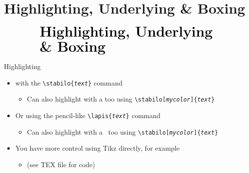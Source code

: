\documentclass[10pt,itemsep]{beamer}
\begin{document}
\section{Highlighting, Underlying \& Boxing}
\begin{frame}
    \begin{eqnarray*}
        &\text{{\huge \textbf{Highlighting, Underlying}}}\\
        &\text{{\huge \textbf{\& Boxing}}}\\
    \end{eqnarray*}
\end{frame}
\shownotesblock{}

\begin{frame}
    {Highlighting}
    \begin{itemize}
        \item {} with the \texttt{\textbackslash stabilo\{\textit{text}\}} command 
        \begin{itemize}
            \item Can also highlight with a  too using \texttt{\textbackslash stabilo[\textit{mycolor}]\{\textit{text}\}}
        \end{itemize}
        \item Or  using the pencil-like \texttt{\textbackslash lapis\{\textit{text}\}} command 
        \begin{itemize}
            \item Can also highlight with a  \ too using \texttt{\textbackslash stabilo[\textit{mycolor}]\{\textit{text}\}}
        \end{itemize}
        \item You have more control using Tikz directly, for example 
        \begin{itemize}
            \item {} (see TEX file for code)
        \end{itemize}
    \end{itemize}
\end{frame}
\shownotesblock{}
\end{document}
